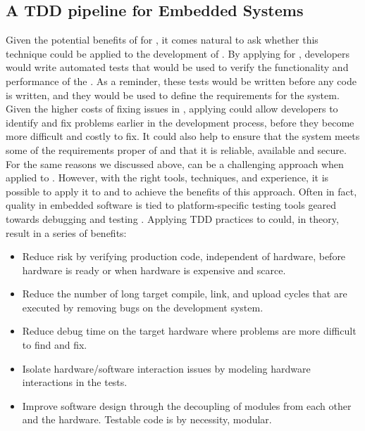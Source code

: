 \subsection{A TDD pipeline for Embedded Systems}
Given the potential benefits of \tdd for \noess, it comes natural to ask whether this technique could be applied to the development of \ess. By applying \tdd for \ess, developers would write automated tests that would be used to verify the functionality and performance of the \es. As a reminder, these tests would be written before any code is written, and they would be used to define the requirements for the system. 
Given the higher costs of fixing issues in \ess, applying \tdd could allow developers to identify and fix problems earlier in the development process, before they become more difficult and costly to fix. It could also help to ensure that the system meets some of the requirements proper of \ess and that it is reliable, available and secure.
For the same reasons we discussed above, \tdd can be a challenging approach when applied to \ess. However, with the right tools, techniques, and experience, it is possible to apply it to \ess and to achieve the benefits of this approach. Often in fact, quality in embedded software is tied to platform-specific testing tools geared towards debugging and testing \cite{TDDEmbeddedSoftware}.
Applying TDD practices to \ess could, in theory, result in a series of benefits:
\begin{itemize}
    \item Reduce risk by verifying production code, independent of hardware, before hardware is ready or when hardware is expensive and scarce.
    \item Reduce the number of long target compile, link, and upload cycles that are executed by removing bugs on the development system.
    \item Reduce debug time on the target hardware where problems are more difficult to find and fix.
    \item Isolate hardware/software interaction issues by modeling hardware interactions in the tests.
    \item Improve software design through the decoupling of modules from each other and the hardware. Testable code is by necessity, modular.
\end{itemize}


